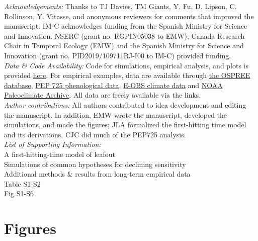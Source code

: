 \documentclass[11pt,letter]{article}
\begin{document}
\emph{Acknowledgements:} Thanks to TJ Davies, TM Giants, Y. Fu, D. Lipson, C. Rollinson, Y. Vitasse, and anonymous reviewers for comments that improved the manuscript.  IM-C acknowledges funding from the Spanish Ministry for Science and Innovation. NSERC (grant no. RGPIN­05038 to EMW), Canada Research Chair in Temporal Ecology (EMW) and the Spanish Ministry for Science and Innovation (grant no. PID2019/109711RJ-I00 to IM-C) provided funding. 
\\ %

\emph{Data \& Code Availability:} Code for simulations, empirical analysis, and plots is provided \href{https://github.com/temporalecologylab/labgit/tree/master/projects/decsenspost}{here}. For empirical examples, data are available through \href{https://knb.ecoinformatics.org}{the OSPREE database}, \href{http://www.pep725.eu/data.php}{PEP 725 phenological data}, \href{https://surfobs.climate.copernicus.eu/dataaccess/access_eobs.php}{E-OBS climate data} and \href{https://www.ncdc.noaa.gov/data-access/paleoclimatology-data/datasets}{NOAA Paleoclimate Archive}. All data are freely available via the links.\\

\emph{Author contributions:} All authors contributed to idea development and editing the manuscript. In addition, EMW wrote the manuscript, developed the simulations, and made the figures; JLA formalized the first-hitting time model and its derivations, CJC did much of the PEP725 analysis.\\

\emph{List of Supporting Information:}\\
A first-hitting-time model of leafout\\
Simulations of common hypotheses for declining sensitivity\\
Additional methods \& results from long-term empirical data\\
Table S1-S2\\
Fig S1-S6

\newpage
\section* {Figures}
\end{document}
